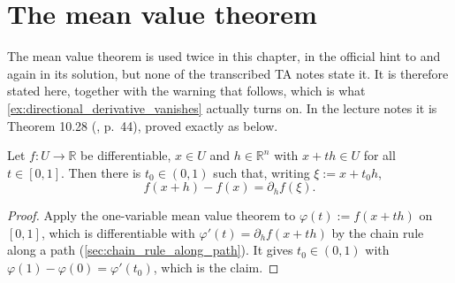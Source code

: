 
\section{The mean value theorem}
\label{sec:mean_value_theorem}

\begin{ainote}
The mean value theorem is used twice in this chapter, in the official hint to  and
again in its solution, but none of the transcribed TA notes state it. It is therefore stated here,
together with the warning that follows, which is what \cref{ex:directional_derivative_vanishes} actually turns on. In the
lecture notes it is Theorem 10.28 (, p.\ 44), proved
exactly as below.
\end{ainote}

\begin{theorem}
\label{thm:mean_value_theorem}
Let $f : U \to \mathbb{R}$ be differentiable, $x \in U$ and $h \in \mathbb{R}^n$ with
$x+th \in U$ for all $t \in [0,1]$. Then there is $t_0 \in (0,1)$ such that, writing
$\xi := x+t_0h$,
\[f(x+h)-f(x) = \partial_hf(\xi).\]
\end{theorem}

\begin{proof}
Apply the one-variable mean value theorem to $\varphi(t) := f(x+th)$ on $[0,1]$, which is
differentiable with $\varphi'(t) = \partial_hf(x+th)$ by the chain rule along a path
(\cref{sec:chain_rule_along_path}). It gives $t_0 \in (0,1)$ with
$\varphi(1)-\varphi(0) = \varphi'(t_0)$, which is the claim.
\end{proof}

